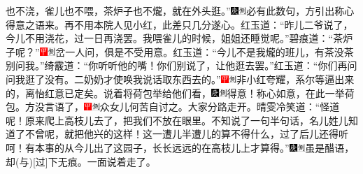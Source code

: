 也不浇，雀儿也不喂，茶炉子也不爖，就在外头逛。''{\includegraphics[width=3mm]{../Images/00004}\includegraphics[width=3mm]{../Images/00011}\footnotesize \kaishu 必有此数句，方引出称心得意之语来。再不用本院人见小红，此差只几分遂心。}红玉道：``昨儿二爷说了，今儿不用浇花，过一日再浇罢。我喂雀儿的时候，姐姐还睡觉呢。''碧痕道：``茶炉子呢？''{\includegraphics[width=3mm]{../Images/00002}\includegraphics[width=3mm]{../Images/00011}\footnotesize \kaishu 岔一人问，俱是不受用意。}红玉道：``今儿不是我爖的班儿，有茶没茶别问我。''绮霰道：``你听听他的嘴！你们别说了，让他逛去罢。''红玉道：``你们再问问我逛了没有。二奶奶才使唤我说话取东西去的。''{\includegraphics[width=3mm]{../Images/00002}\includegraphics[width=3mm]{../Images/00011}\footnotesize \kaishu 非小红夸耀，系尔等逼出来的，离怡红意已定矣。}说着将荷包举给他们看，{\includegraphics[width=3mm]{../Images/00004}\includegraphics[width=3mm]{../Images/00011}\footnotesize \kaishu 得意！称心如意，在此一举荷包。}方没言语了，{\includegraphics[width=3mm]{../Images/00002}\includegraphics[width=3mm]{../Images/00011}\footnotesize \kaishu 众女儿何苦自讨之。}大家分路走开。晴雯冷笑道：``怪道呢！原来爬上高枝儿去了，把我们不放在眼里。不知说了一句半句话，名儿姓儿知道了不曾呢，就把他兴的这样！这一遭儿半遭儿的算不得什么，过了后儿还得听呵！有本事的从今儿出了这园子，长长远远的在高枝儿上才算得。''{{\includegraphics[width=3mm]{../Images/00004}\includegraphics[width=3mm]{../Images/00011}\footnotesize \kaishu 虽是醋语，却{(与)}{[}过{]}下无痕。}}一面说着走了。

